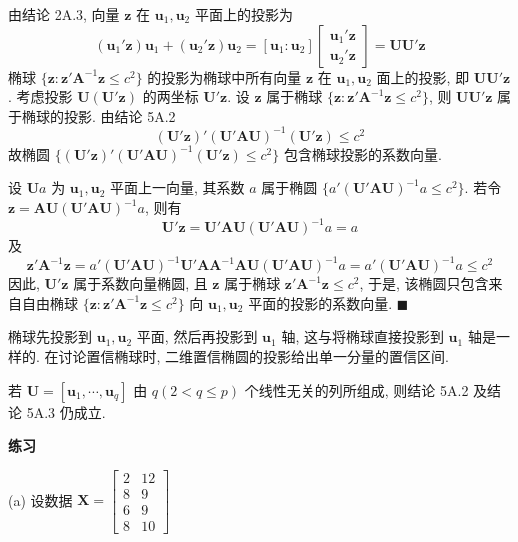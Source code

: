 \quad 由结论 2A.3, 向量 $\mathbf{z}$ 在 $\mathbf{u}_1,\mathbf{u}_2$ 平面上的投影为
\[
(\mathbf{u}_1'\mathbf{z})\mathbf{u}_1+(\mathbf{u}_2'\mathbf{z})\mathbf{u}_2
=[\mathbf{u}_1:\mathbf{u}_2]\begin{bmatrix}\mathbf{u}_1'\mathbf{z}\\\mathbf{u}_2'\mathbf{z}\end{bmatrix}
=\mathbf{U}\mathbf{U}'\mathbf{z}
\]
椭球 $\{\mathbf{z}:\mathbf{z}'\mathbf{A}^{-1}\mathbf{z}\le c^2\}$ 的投影为椭球中所有向量 $\mathbf{z}$ 在 $\mathbf{u}_1,\mathbf{u}_2$ 面上的投影, 即 $\mathbf{U}\mathbf{U}'\mathbf{z}$. 考虑投影 $\mathbf{U}(\mathbf{U}'\mathbf{z})$ 的两坐标 $\mathbf{U}'\mathbf{z}$. 设 $\mathbf{z}$ 属于椭球 $\{\mathbf{z}:\mathbf{z}'\mathbf{A}^{-1}\mathbf{z}\le c^2\}$, 则 $\mathbf{U}\mathbf{U}'\mathbf{z}$ 属于椭球的投影. 由结论 5A.2
\[
(\mathbf{U}'\mathbf{z})'(\mathbf{U}'\mathbf{A}\mathbf{U})^{-1}(\mathbf{U}'\mathbf{z})\le c^2
\]
故椭圆 $\{(\mathbf{U}'\mathbf{z})'(\mathbf{U}'\mathbf{A}\mathbf{U})^{-1}(\mathbf{U}'\mathbf{z})\le c^2\}$ 包含椭球投影的系数向量.

设 $\mathbf{U}a$ 为 $\mathbf{u}_1,\mathbf{u}_2$ 平面上一向量, 其系数 $a$ 属于椭圆 $\{a'(\mathbf{U}'\mathbf{A}\mathbf{U})^{-1}a\le c^2\}$. 若令 $\mathbf{z}=\mathbf{A}\mathbf{U}(\mathbf{U}'\mathbf{A}\mathbf{U})^{-1}a$, 则有
\[
\mathbf{U}'\mathbf{z}=\mathbf{U}'\mathbf{A}\mathbf{U}(\mathbf{U}'\mathbf{A}\mathbf{U})^{-1}a=a
\]
及
\[
\mathbf{z}'\mathbf{A}^{-1}\mathbf{z}=a'(\mathbf{U}'\mathbf{A}\mathbf{U})^{-1}\mathbf{U}'\mathbf{A}\mathbf{A}^{-1}\mathbf{A}\mathbf{U}(\mathbf{U}'\mathbf{A}\mathbf{U})^{-1}a=a'(\mathbf{U}'\mathbf{A}\mathbf{U})^{-1}a\le c^2
\]
因此, $\mathbf{U}'\mathbf{z}$ 属于系数向量椭圆, 且 $\mathbf{z}$ 属于椭球 $\mathbf{z}'\mathbf{A}^{-1}\mathbf{z}\le c^2$, 于是, 该椭圆只包含来自自由椭球 $\{\mathbf{z}:\mathbf{z}'\mathbf{A}^{-1}\mathbf{z}\le c^2\}$ 向 $\mathbf{u}_1,\mathbf{u}_2$ 平面的投影的系数向量. \hfill$\blacksquare$

\quad 椭球先投影到 $\mathbf{u}_1,\mathbf{u}_2$ 平面, 然后再投影到 $\mathbf{u}_1$ 轴, 这与将椭球直接投影到 $\mathbf{u}_1$ 轴是一样的. 在讨论置信椭球时, 二维置信椭圆的投影给出单一分量的置信区间.

\quad 若 $\mathbf{U}=[\mathbf{u}_1,\cdots,\mathbf{u}_q]$ 由 $q(2<q\le p)$ 个线性无关的列所组成, 则结论 5A.2 及结论 5A.3 仍成立.

\vspace{6pt}
{\large\bfseries 练习}

\medskip
{}\quad (a) 设数据 $\mathbf{X}=\begin{bmatrix}2&12\\8&9\\6&9\\8&10\end{bmatrix}$
